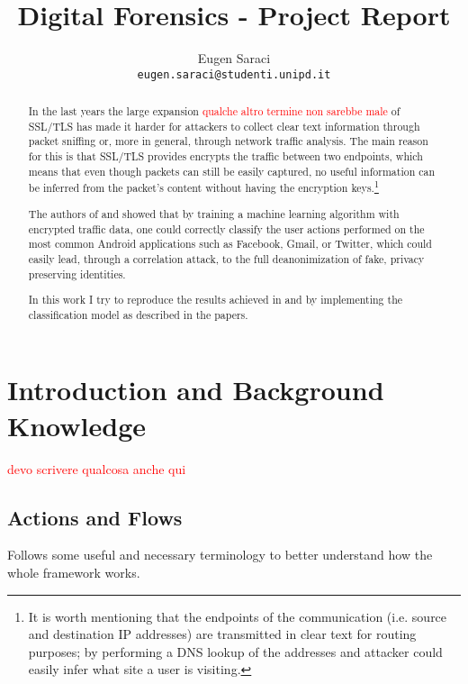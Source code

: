 \documentclass[a4paper,10pt]{scrartcl}
\title{Digital Forensics - Project Report}
\author{Eugen Saraci\\ \small{\texttt{eugen.saraci@studenti.unipd.it}}}
\newcommand\todo[1]{\textcolor{red}{#1}}
\begin{document}
\maketitle

\begin{abstract}
 In the last years the large expansion \todo{qualche altro termine non sarebbe male} of SSL/TLS has made it harder for attackers to collect clear text information through packet sniffing or, more in general, through network traffic analysis. The main reason for this is that SSL/TLS provides encrypts the traffic between two endpoints, which means that even though packets can still be easily captured, no useful information can be inferred from the packet's content without having the encryption keys.\footnote{It is worth mentioning that the endpoints of the communication (i.e. source and destination IP addresses) are transmitted in clear text for routing purposes; by performing a DNS lookup of the addresses and attacker could easily infer what site a user is visiting.}

The authors of \cite{contiknocking} and \cite{contianalysis} showed that by training a machine learning algorithm with encrypted traffic data, one could correctly classify the user actions performed on the most common Android applications such as Facebook, Gmail, or Twitter, which could easily lead, through a correlation attack, to the full deanonimization of fake, privacy preserving identities.

In this work I try to reproduce the results achieved in \cite{contiknocking} and \cite{contianalysis} by implementing the classification model as described in the papers.
\vspace{0.5cm}
\end{abstract}

\section{Introduction and Background Knowledge}
\label{sec:intro}
\todo{devo scrivere qualcosa anche qui}
\subsection{Actions and Flows}
\label{subsec:flows}
Follows some useful and necessary terminology to better understand how the whole framework works.
\end{document}

